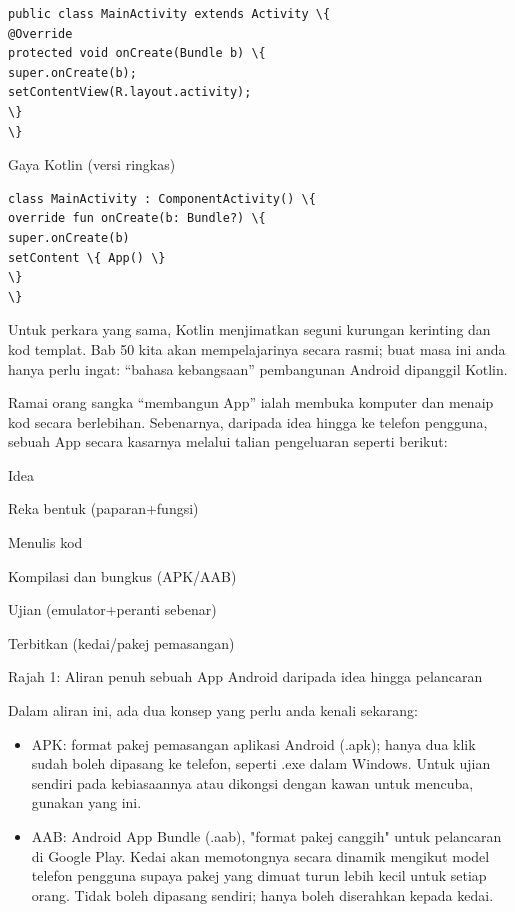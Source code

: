 \begin{lstlisting}
public class MainActivity extends Activity \{
@Override
protected void onCreate(Bundle b) \{
super.onCreate(b);
setContentView(R.layout.activity);
\}
\}
\end{lstlisting}

Gaya Kotlin (versi ringkas)

\begin{lstlisting}
class MainActivity : ComponentActivity() \{
override fun onCreate(b: Bundle?) \{
super.onCreate(b)
setContent \{ App() \}
\}
\}
\end{lstlisting}

Untuk perkara yang sama, Kotlin menjimatkan seguni kurungan kerinting dan kod templat. Bab 50 kita akan mempelajarinya secara rasmi; buat masa ini anda hanya perlu ingat: “bahasa kebangsaan” pembangunan Android dipanggil Kotlin.


Ramai orang sangka “membangun App” ialah membuka komputer dan menaip kod secara berlebihan. Sebenarnya, daripada idea hingga ke telefon pengguna, sebuah App secara kasarnya melalui talian pengeluaran seperti berikut:

Idea

Reka bentuk (paparan+fungsi)

Menulis kod

Kompilasi dan bungkus (APK/AAB)

Ujian (emulator+peranti sebenar)

Terbitkan (kedai/pakej pemasangan)

\begin{center}\small\color{gray}Rajah 1: Aliran penuh sebuah App Android daripada idea hingga pelancaran\end{center}

Dalam aliran ini, ada dua konsep yang perlu anda kenali sekarang:

\begin{itemize}
  \item APK: format pakej pemasangan aplikasi Android (.apk); hanya dua klik sudah boleh dipasang ke telefon, seperti .exe dalam Windows. Untuk ujian sendiri pada kebiasaannya atau dikongsi dengan kawan untuk mencuba, gunakan yang ini.
  \item AAB: Android App Bundle (.aab), "format pakej canggih" untuk pelancaran di Google Play. Kedai akan memotongnya secara dinamik mengikut model telefon pengguna supaya pakej yang dimuat turun lebih kecil untuk setiap orang. Tidak boleh dipasang sendiri; hanya boleh diserahkan kepada kedai.
\end{itemize}


